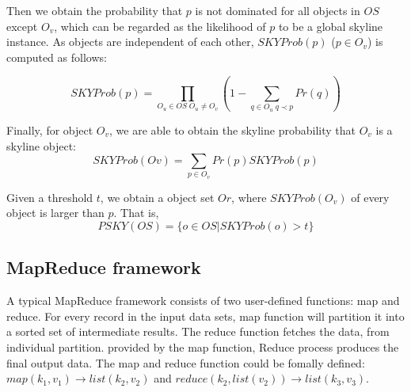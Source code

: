 Then we obtain the probability that \(p\) is not dominated for all objects in \(OS\) except $O_v$, which can be regarded as the likelihood of  $p$ to be a global skyline instance. As objects are independent of each other, \(SKYProb(p)\) (\( p \in O_{v}\)) is computed as follows:

\begin{equation}
SKYProb(p) = \prod_{O_{u} \in OS \; O_{u} \ne O_{v}}(1 - \sum_{q \in O_{u} \; q \prec p}Pr(q))
\end{equation}

Finally, for object \(O_{v}\), we are able to obtain the skyline probability that \(O_{v}\) is a skyline object:
\begin{equation}
\label{equ_final}
SKYProb(O{v}) = \sum_{p \in O_{v}} Pr(p)SKY Prob(p)
\end{equation}

Given a threshold \(t\), we obtain a object set $Or$, where $SKYProb(O_v)$ of every object is larger than $p$. That is,
\begin{equation}
\label{equ_threshold}
PSKY(OS) = \{ o \in OS|SKYProb(o)>t \}
\end{equation}

\subsection{MapReduce framework} %
A typical MapReduce framework consists of two user-defined functions: map and reduce. For every record in the input data sets, map function will partition it into a sorted set of intermediate results. The reduce function fetches the data, from individual partition. provided by the map function, Reduce process produces the final output data. The map and reduce function could be fomally defined: \(map(k_{1},v_{1}) \rightarrow list(k_{2}, v_{2}) \) and \(reduce(k_{2},list(v_{2})) \rightarrow list(k_{3}, v_{3}) \).
